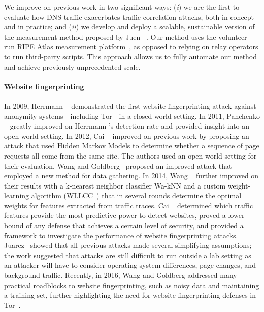 We improve on previous work in two significant ways: (\emph{i}) we are
the first to evaluate how DNS traffic exacerbates traffic correlation
attacks, both in concept and in practice; and (\emph{ii}) we develop and
deploy a scalable, sustainable version of the measurement method proposed by Juen
\ea~\cite{Juen2015a}.  Our method uses the volunteer-run RIPE Atlas
measurement platform~\cite{atlas}, as opposed to relying on relay operators
to run third-party scripts.  This approach allows us to fully automate
our method and achieve previously unprecedented scale.

\paragraph{Website fingerprinting}
In 2009, Herrmann \ea~\cite{Herrmann2009a} demonstrated the first website
fingerprinting attack against anonymity systems---including Tor---in a
closed-world setting.  In 2011, Panchenko \ea~\cite{Panchenko2011a} greatly
improved on Herrmann \ea's detection rate and provided insight into an open-world
setting.  In 2012, Cai \ea~\cite{Cai2012a} improved on previous work by
proposing an attack that used Hidden Markov Models to determine whether a sequence of
page requests all come from the same site.  The authors used an open-world
setting for their evaluation.  Wang and Goldberg~\cite{Wang2013a} proposed an
improved attack that employed a new method for data gathering.  In 2014, Wang
\ea~\cite{Wang2014a} further improved on their results with a
k-nearest neighbor classifier Wa-kNN and a custom weight-learning algorithm
(WLLCC~\cite{Wang2015a}) that in several rounds determine the optimal weights
for features extracted from traffic traces.
Cai \ea~\cite{Cai2014b}
determined which traffic features provide the most predictive power to detect
websites, proved a lower bound of any defense that achieves a certain level of
security, and provided a framework to investigate the performance of
website fingerprinting attacks.
Juarez~\cite{Juarez2014a} showed that all previous attacks
made several simplifying
assumptions; the work suggested that attacks are still
difficult to run outside a lab setting as an attacker will have to consider
operating system differences, page changes, and background traffic.
Recently, in 2016, Wang and Goldberg addressed many practical
roadblocks to website fingerprinting, such as noisy data and maintaining a training set,
further highlighting the need for website fingerprinting defenses in
Tor~\cite{Wang2016a}.

